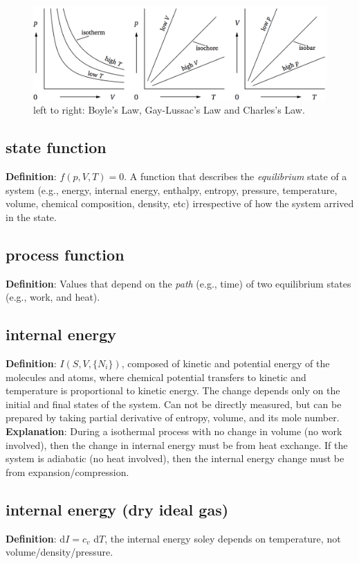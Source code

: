 \begin{figure}[H]
   \includegraphics[width=1\textwidth, height=0.3\textwidth]{pVT.png}
   \caption{\label{pVT}
      left to right: Boyle's Law, Gay-Lussac's Law and Charles's Law.}
\end{figure}
\subsection{state function}
{\bf Definition}: $f(p,V,T)=0$.  A function that describes the \emph{equilibrium} state of a system (e.g., energy,
internal energy, enthalpy, entropy, pressure, temperature, volume, chemical composition, density,
etc) irrespective of how the system arrived in the state. 

\subsection{process function}
{\bf Definition}: Values that depend on the \emph{path} (e.g., time) of two equilibrium states (e.g.,
work, and heat).



\subsection{internal energy}
{\bf{Definition}}: $I(S,V,\{N_i\})$, composed of kinetic and potential energy of the molecules and
atoms, where chemical potential transfers to kinetic and temperature is proportional to kinetic
energy. The change depends only on the initial and final states of the system. Can not be directly
measured, but can be prepared by taking partial derivative of entropy, volume, and its mole number. \\

{\bf Explanation}: During a isothermal process with no change in volume (no work involved), then the
change in internal energy must be from heat exchange. If the system is adiabatic (no heat involved),
then the internal energy change must be from expansion/compression.

\subsection{internal energy (dry ideal gas)}
{\bf{Definition}}: d$I = c_v$ d$T$, the internal energy soley depends on temperature, not
volume/density/pressure. \\

